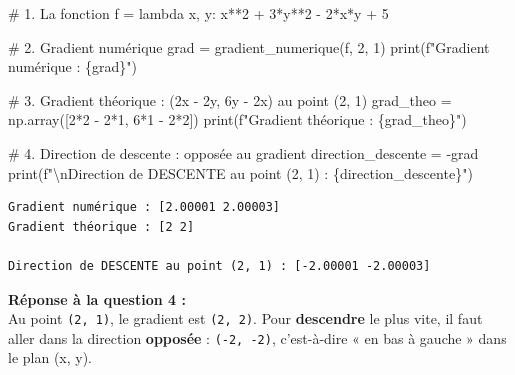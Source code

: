 \documentclass[
  french,
  11pt,
  a4paper,
]{scrbook}
\newenvironment{Shaded}{}{}
\newcommand{\BuiltInTok}[1]{\textcolor[rgb]{0.84,0.23,0.29}{#1}}
\newcommand{\CharTok}[1]{\textcolor[rgb]{0.01,0.18,0.38}{#1}}
\newcommand{\CommentTok}[1]{\textcolor[rgb]{0.42,0.45,0.49}{#1}}
\newcommand{\DecValTok}[1]{\textcolor[rgb]{0.00,0.36,0.77}{#1}}
\newcommand{\KeywordTok}[1]{\textcolor[rgb]{0.84,0.23,0.29}{#1}}
\newcommand{\NormalTok}[1]{\textcolor[rgb]{0.14,0.16,0.18}{#1}}
\newcommand{\OperatorTok}[1]{\textcolor[rgb]{0.14,0.16,0.18}{#1}}
\newcommand{\SpecialCharTok}[1]{\textcolor[rgb]{0.00,0.36,0.77}{#1}}
\newcommand{\SpecialStringTok}[1]{\textcolor[rgb]{0.01,0.18,0.38}{#1}}
\begin{document}
\begin{tcolorbox}[enhanced jigsaw, arc=.35mm, bottomrule=.15mm, bottomtitle=1mm, breakable, colback=white, colbacktitle=quarto-callout-tip-color!10!white, colframe=quarto-callout-tip-color-frame, coltitle=black, left=2mm, leftrule=.75mm, opacityback=0, opacitybacktitle=0.6, rightrule=.15mm, title=\textcolor{quarto-callout-tip-color}{\faLightbulb}\hspace{0.5em}{✅ Voir la correction}, titlerule=0mm, toprule=.15mm, toptitle=1mm]

\begin{Shaded}
\begin{Highlighting}[]
\CommentTok{\# 1. La fonction}
\NormalTok{f }\OperatorTok{=} \KeywordTok{lambda}\NormalTok{ x, y: x}\OperatorTok{**}\DecValTok{2} \OperatorTok{+} \DecValTok{3}\OperatorTok{*}\NormalTok{y}\OperatorTok{**}\DecValTok{2} \OperatorTok{{-}} \DecValTok{2}\OperatorTok{*}\NormalTok{x}\OperatorTok{*}\NormalTok{y }\OperatorTok{+} \DecValTok{5}

\CommentTok{\# 2. Gradient numérique}
\NormalTok{grad }\OperatorTok{=}\NormalTok{ gradient\_numerique(f, }\DecValTok{2}\NormalTok{, }\DecValTok{1}\NormalTok{)}
\BuiltInTok{print}\NormalTok{(}\SpecialStringTok{f"Gradient numérique : }\SpecialCharTok{\{}\NormalTok{grad}\SpecialCharTok{\}}\SpecialStringTok{"}\NormalTok{)}

\CommentTok{\# 3. Gradient théorique : (2x {-} 2y, 6y {-} 2x) au point (2, 1)}
\NormalTok{grad\_theo }\OperatorTok{=}\NormalTok{ np.array([}\DecValTok{2}\OperatorTok{*}\DecValTok{2} \OperatorTok{{-}} \DecValTok{2}\OperatorTok{*}\DecValTok{1}\NormalTok{, }\DecValTok{6}\OperatorTok{*}\DecValTok{1} \OperatorTok{{-}} \DecValTok{2}\OperatorTok{*}\DecValTok{2}\NormalTok{])}
\BuiltInTok{print}\NormalTok{(}\SpecialStringTok{f"Gradient théorique : }\SpecialCharTok{\{}\NormalTok{grad\_theo}\SpecialCharTok{\}}\SpecialStringTok{"}\NormalTok{)}

\CommentTok{\# 4. Direction de descente : opposée au gradient}
\NormalTok{direction\_descente }\OperatorTok{=} \OperatorTok{{-}}\NormalTok{grad}
\BuiltInTok{print}\NormalTok{(}\SpecialStringTok{f"}\CharTok{\textbackslash{}n}\SpecialStringTok{Direction de DESCENTE au point (2, 1) : }\SpecialCharTok{\{}\NormalTok{direction\_descente}\SpecialCharTok{\}}\SpecialStringTok{"}\NormalTok{)}
\end{Highlighting}
\end{Shaded}

\begin{verbatim}
Gradient numérique : [2.00001 2.00003]
Gradient théorique : [2 2]

Direction de DESCENTE au point (2, 1) : [-2.00001 -2.00003]
\end{verbatim}

\textbf{Réponse à la question 4 :}\\
Au point \texttt{(2,\ 1)}, le gradient est \texttt{(2,\ 2)}. Pour
\textbf{descendre} le plus vite, il faut aller dans la direction
\textbf{opposée} : \texttt{(-2,\ -2)}, c'est-à-dire « en bas à gauche »
dans le plan (x, y).

\end{tcolorbox}
\end{document}

